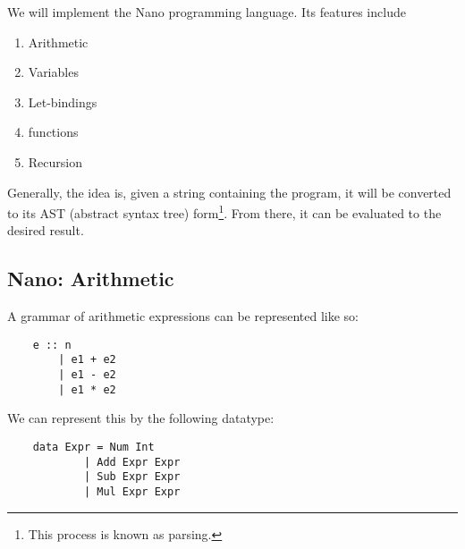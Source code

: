 \documentclass[letterpaper]{article}
\begin{document}
\bigskip 

We will implement the Nano programming language. Its features include
\begin{enumerate}
    \item Arithmetic
    \item Variables
    \item Let-bindings
    \item functions
    \item Recursion
\end{enumerate}
Generally, the idea is, given a string containing the program, it will be converted to its AST (abstract syntax tree) form\footnote{This process is known as parsing.}. From there, it can be evaluated to the desired result. 

\subsection{Nano: Arithmetic}
A grammar of arithmetic expressions can be represented like so: 
\begin{verbatim}
    e :: n 
        | e1 + e2 
        | e1 - e2 
        | e1 * e2\end{verbatim}
We can represent this by the following datatype: 
\begin{verbatim}
    data Expr = Num Int 
            | Add Expr Expr 
            | Sub Expr Expr 
            | Mul Expr Expr\end{verbatim}
\end{document}
